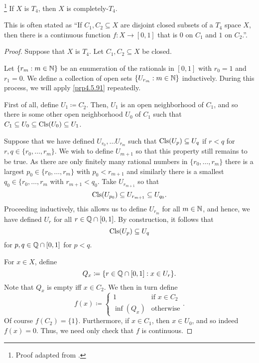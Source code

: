 \begin{thm}\footnote{Proof adapted from \cite[pg.~207]{Munkres}.}\label{UrysohnsLemma}
If $X$ is $T_4$, then $X$ is completely-$T_4$.
\begin{rmk}
This is often stated as ``If $C_1,C_2\subseteq X$ are disjoint closed subsets of a $T_4$ space $X$, then there is a continuous function $f:X\rightarrow [0,1]$ that is $0$ on $C_1$ and $1$ on $C_2$.''.
\end{rmk}
\begin{proof}
Suppose that $X$ is $T_4$.  Let $C_1,C_2\subseteq X$ be closed.

Let $\{ r_m:m\in \mathbb{N} \}$ be an enumeration of the rationals in $[0,1]$ with $r_0=1$ and $r_1=0$.  We define a collection of open sets $\{ U_{r_m}:m\in \mathbb{N} \}$ inductively.  During this process, we will apply \cref{prp4.5.91} repeatedly.

First of all, define $U_1\coloneqq C_2^{\comp}$.  Then, $U_1$ is an open neighborhood of $C_1$, and so there is some other open neighborhood $U_0$ of $C_1$ such that $C_1\subseteq U_0\subseteq \operatorname{Cls} (U_0)\subseteq U_1$.

Suppose that we have defined $U_{r_0},\ldots U_{r_m}$ such that $\operatorname{Cls} (U_p)\subseteq U_q$ if $r<q$ for $r,q\in \{ r_0,\ldots ,r_m\}$.  We wish to define $U_{m+1}$ so that this property still remains to be true.  As there are only finitely many rational numbers in $\{ r_0,\ldots ,r_m\}$ there is a largest $p_0\in \{ r_0,\ldots ,r_m\}$ with $p_0<r_{m+1}$ and similarly there is a smallest $q_0\in \{ r_0,\ldots ,r_m$ with $r_{m+1}<q_0$.  Take $U_{r_{m+1}}$ so that
\begin{equation}
\operatorname{Cls} (U_{p_0})\subseteq U_{r_{m+1}}\subseteq U_{q_0}.
\end{equation}
Proceeding inductively, this allows us to define $U_{r_m}$ for all $m\in \mathbb{N}$, and hence, we have defined $U_r$ for all $r\in \mathbb{Q} \cap [0,1]$.  By construction, it follows that
\begin{equation}
\operatorname{Cls} (U_p)\subseteq U_q
\end{equation}
for $p,q\in \mathbb{Q} \cap [0,1]$ for $p<q$.

For $x\in X$, define
\begin{equation}
Q_x\coloneqq \{ r\in \mathbb{Q} \cap [0,1]:x\in U_r\} .
\end{equation}
Note that $Q_x$ is empty iff $x\in C_2$.  We then in turn define
\begin{equation}
f(x)\coloneqq \begin{cases}1 & \text{if }x\in C_2 \\ \inf \left( Q_x\right) & \text{otherwise}\end{cases}.
\end{equation}
Of course $f(C_2)=\{ 1\}$.  Furthermore, if $x\in C_1$, then $x\in U_0$, and so indeed $f(x)=0$.  Thus, we need only check that $f$ is continuous.


\end{proof}
\end{thm}
